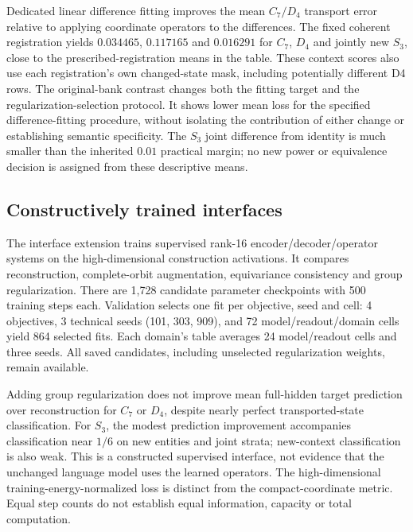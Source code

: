 Dedicated linear difference fitting improves the mean $C_7/D_4$ transport error relative to applying coordinate operators to the differences. The fixed coherent registration yields $0.034465$, $0.117165$ and $0.016291$ for $C_7$, $D_4$ and jointly new $S_3$, close to the prescribed-registration means in the table. These context scores also use each registration's own changed-state mask, including potentially different D4 rows. The original-bank contrast changes both the fitting target and the regularization-selection protocol. It shows lower mean loss for the specified difference-fitting procedure, without isolating the contribution of either change or establishing semantic specificity. The $S_3$ joint difference from identity is much smaller than the inherited $0.01$ practical margin; no new power or equivalence decision is assigned from these descriptive means.

\subsection{Constructively trained interfaces}

The interface extension trains supervised rank-16 encoder/decoder/operator systems on the high-dimensional construction activations. It compares reconstruction, complete-orbit augmentation, equivariance consistency and group regularization. There are 1,728 candidate parameter checkpoints with 500 training steps each. Validation selects one fit per objective, seed and cell: 4 objectives, 3 technical seeds (101, 303, 909), and 72 model/readout/domain cells yield 864 selected fits. Each domain's table averages 24 model/readout cells and three seeds. All saved candidates, including unselected regularization weights, remain available.

Adding group regularization does not improve mean full-hidden target prediction over reconstruction for $C_7$ or $D_4$, despite nearly perfect transported-state classification. For $S_3$, the modest prediction improvement accompanies classification near $1/6$ on new entities and joint strata; new-context classification is also weak. This is a constructed supervised interface, not evidence that the unchanged language model uses the learned operators. The high-dimensional training-energy-normalized loss is distinct from the compact-coordinate metric. Equal step counts do not establish equal information, capacity or total computation.

